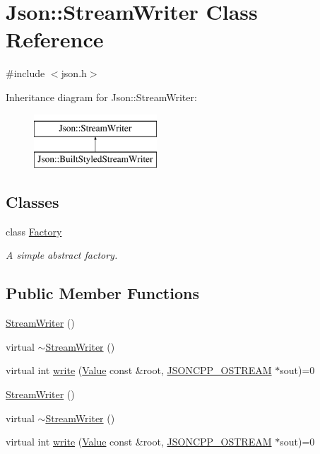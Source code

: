 \hypertarget{class_json_1_1_stream_writer}{}\section{Json\+:\+:Stream\+Writer Class Reference}
\label{class_json_1_1_stream_writer}


{\ttfamily \#include $<$json.\+h$>$}

Inheritance diagram for Json\+:\+:Stream\+Writer\+:\begin{figure}[H]
\begin{center}
\leavevmode
\includegraphics[height=2.000000cm]{class_json_1_1_stream_writer}
\end{center}
\end{figure}
\subsection*{Classes}
\begin{DoxyCompactItemize}
\item 
class \hyperlink{class_json_1_1_stream_writer_1_1_factory}{Factory}
\begin{DoxyCompactList}\small\item\em A simple abstract factory. \end{DoxyCompactList}\end{DoxyCompactItemize}
\subsection*{Public Member Functions}
\begin{DoxyCompactItemize}
\item 
\hyperlink{class_json_1_1_stream_writer_a66e6f5113618ce6b04cac9b3c85a3707}{Stream\+Writer} ()
\item 
virtual \hyperlink{class_json_1_1_stream_writer_a03f8fb6a873b6b50f05bc4556e043c3a}{$\sim$\+Stream\+Writer} ()
\item 
virtual int \hyperlink{class_json_1_1_stream_writer_a84278bad0c9a9fc587bc2a97c5bb5993}{write} (\hyperlink{class_json_1_1_value}{Value} const \&root, \hyperlink{config_8h_a37a25be5fca174927780caeb280094ce}{J\+S\+O\+N\+C\+P\+P\+\_\+\+O\+S\+T\+R\+E\+AM} $\ast$sout)=0
\item 
\hyperlink{class_json_1_1_stream_writer_a66e6f5113618ce6b04cac9b3c85a3707}{Stream\+Writer} ()
\item 
virtual \hyperlink{class_json_1_1_stream_writer_af864b265ff4eae8e84307c23f8444799}{$\sim$\+Stream\+Writer} ()
\item 
virtual int \hyperlink{class_json_1_1_stream_writer_a84278bad0c9a9fc587bc2a97c5bb5993}{write} (\hyperlink{class_json_1_1_value}{Value} const \&root, \hyperlink{config_8h_a37a25be5fca174927780caeb280094ce}{J\+S\+O\+N\+C\+P\+P\+\_\+\+O\+S\+T\+R\+E\+AM} $\ast$sout)=0
\end{DoxyCompactItemize}

